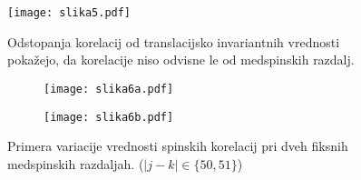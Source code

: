 \documentclass[a4paper]{article}
\begin{document}
    \begin{figure}
        \centering
        \texttt{[image: slika5.pdf]}
        \caption{Odstopanja korelacij od translacijsko invariantnih vrednosti pokažejo, da korelacije niso odvisne le od medspinskih razdalj.}
        \label{slika5}
    \end{figure}

    \begin{figure}
        \centering
        \begin{subfigure}{\textwidth}
            \texttt{[image: slika6a.pdf]}
        \end{subfigure}
        \begin{subfigure}{\textwidth}
            \texttt{[image: slika6b.pdf]}
        \end{subfigure}
        \caption{Primera variacije vrednosti spinskih korelacij pri dveh fiksnih medspinskih razdaljah. ($|j - k| \in \{50, 51\}$)}
        \label{slika6}
    \end{figure}
\end{document}
